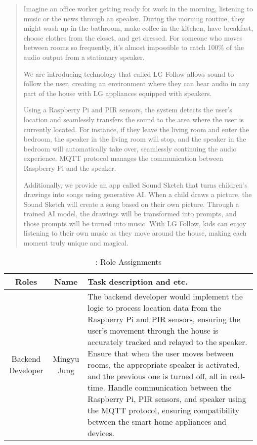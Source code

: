 \documentclass[conference]{IEEEtran}
\begin{document}
\begin{abstract}
    Imagine an office worker getting ready for work in the morning, listening to music or the news through an speaker. During the morning routine, they might wash up in the bathroom, make coffee in the kitchen, have breakfast, choose clothes from the closet, and get dressed. For someone who moves between rooms so frequently, it's almost impossible to catch 100\% of the audio output from a stationary speaker.
    
    We are introducing technology that called LG Follow allows sound to follow the user, creating an environment where they can hear audio in any part of the house with LG appliances equipped with speakers.
    
    Using a Raspberry Pi and PIR sensors, the system detects the user's location and seamlessly transfers the sound to the area where the user is currently located. For instance, if they leave the living room and enter the bedroom, the speaker in the living room will stop, and the speaker in the bedroom will automatically take over, seamlessly continuing the audio experience. MQTT protocol manages the communication between Raspberry Pi and the speaker.
    
    Additionally, we provide an app called Sound Sketch that turns children's drawings into songs using generative AI. When a child draws a picture, the Sound Sketch will create a song based on their own picture. Through a trained AI model, the drawings will be transformed into prompts, and those prompts will be turned into music. With LG Follow, kids can enjoy listening to their own music as they move around the house, making each moment truly unique and magical.

\end{abstract}





\begin{table}[h!]
\centering
\caption{: Role Assignments}
\begin{tabular}{|c|c|p{3.5cm}|}
\hline
\textbf{Roles} & \textbf{Name} & \textbf{Task description and etc.} \\
\hline
Backend Developer & Mingyu Jung & The backend developer would implement the logic to process location data from the Raspberry Pi and PIR sensors, ensuring the user’s movement through the house is accurately tracked and relayed to the speaker. Ensure that when the user moves between rooms, the appropriate speaker is activated, and the previous one is turned off, all in real-time. Handle communication between the Raspberry Pi, PIR sensors, and speaker using the MQTT protocol, ensuring compatibility between the smart home appliances and devices. \\
\hline

\end{tabular}
\end{table}
\end{document}
